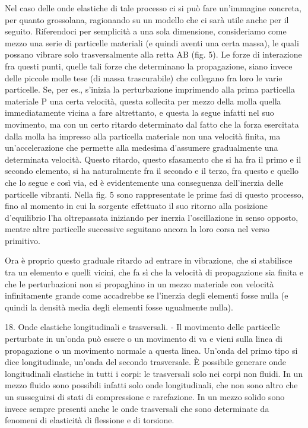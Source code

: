 \documentclass[a4paper]{article}
\begin{document}
Nel caso delle onde elastiche di tale processo ci si può fare un'immagine concreta, per quanto grossolana, ragionando su un modello che ci sarà utile anche per il seguito. Riferendoci per semplicità a una sola dimensione, consideriamo come mezzo una serie di particelle materiali (e quindi aventi una certa massa), le quali possano vibrare solo trasversalmente alla retta AB (fig. 5). Le forze di interazione fra questi punti, quelle tali forze che determinano la propagazione, siano invece delle piccole molle tese (di massa trascurabile) che collegano fra loro le varie particelle. Se, per es., s'inizia la perturbazione imprimendo alla prima particella materiale P una certa velocità, questa sollecita per mezzo della molla quella immediatamente vicina a fare altrettanto, e questa la segue infatti nel suo movimento, ma con un certo ritardo determinato dal fatto che la forza esercitata dalla molla ha impresso alla particella materiale non una velocità finita, ma un'accelerazione che permette alla medesima d'assumere gradualmente una determinata velocità. Questo ritardo, questo sfasamento che si ha fra il primo e il secondo elemento, si ha naturalmente fra il secondo e il terzo, fra questo e quello che lo segue e così via, ed è evidentemente una conseguenza dell'inerzia delle particelle vibranti. Nella fig. 5 sono rappresentate le prime fasi di questo processo, fino al momento in cui la sorgente effettuato il suo ritorno alla posizione d'equilibrio l'ha oltrepassata iniziando per inerzia l'oscillazione in senso opposto, mentre altre particelle successive seguitano ancora la loro corsa nel verso primitivo.

Ora è proprio questo graduale ritardo ad entrare in vibrazione, che si stabilisce tra un elemento e quelli vicini, che fa sì che la velocità di propagazione sia finita e che le perturbazioni non si propaghino in un mezzo materiale con velocità infinitamente grande come accadrebbe se l'inerzia degli elementi fosse nulla (e quindi la densità media degli elementi fosse ugualmente nulla).

18. Onde elastiche longitudinali e trasversali. - Il movimento delle particelle perturbate in un'onda può essere o un movimento di va e vieni sulla linea di propagazione o un movimento normale a questa linea. Un'onda del primo tipo si dice longitudinale, un'onda del secondo trasversale. È possibile generare onde longitudinali elastiche in tutti i corpi: le trasversali solo nei corpi non fluidi. In un mezzo fluido sono possibili infatti solo onde longitudinali, che non sono altro che un susseguirsi di stati di compressione e rarefazione. In un mezzo solido sono invece sempre presenti anche le onde trasversali che sono determinate da fenomeni di elasticità di flessione e di torsione.
\end{document}
